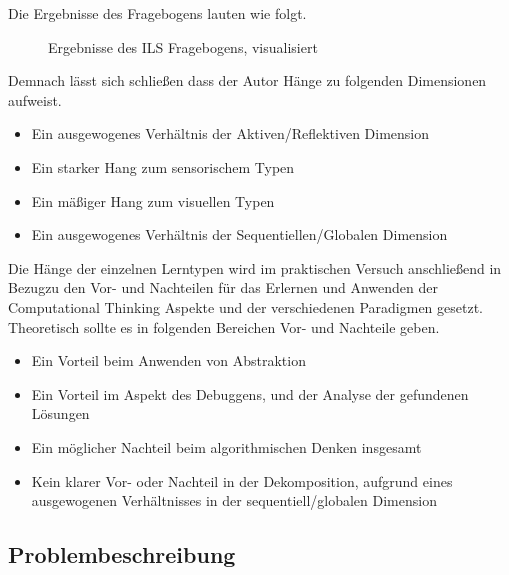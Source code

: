 Die Ergebnisse des Fragebogens lauten wie folgt.

\begin{figure}[H]
    \centering
    
    \caption{Ergebnisse des ILS Fragebogens, visualisiert}
\end{figure}

Demnach lässt sich schließen dass der Autor Hänge zu folgenden Dimensionen aufweist.

\begin{itemize}
    \item Ein ausgewogenes Verhältnis der Aktiven/Reflektiven Dimension
    \item Ein starker Hang zum sensorischem Typen 
    \item Ein mäßiger Hang zum visuellen Typen
    \item Ein ausgewogenes Verhältnis der Sequentiellen/Globalen Dimension
\end{itemize}


Die Hänge der einzelnen Lerntypen wird im praktischen Versuch anschließend in Bezugzu den Vor- und Nachteilen für das Erlernen und Anwenden der Computational Thinking Aspekte und der verschiedenen Paradigmen gesetzt.
Theoretisch sollte es in folgenden Bereichen Vor- und Nachteile geben.

\begin{itemize}
    \item Ein Vorteil beim Anwenden von Abstraktion
    \item Ein Vorteil im Aspekt des Debuggens, und der Analyse der gefundenen Lösungen
    \item Ein möglicher Nachteil beim algorithmischen Denken insgesamt
    \item Kein klarer Vor- oder Nachteil in der Dekomposition, aufgrund eines ausgewogenen Verhältnisses in der sequentiell/globalen Dimension
\end{itemize}

\subsection{Problembeschreibung}